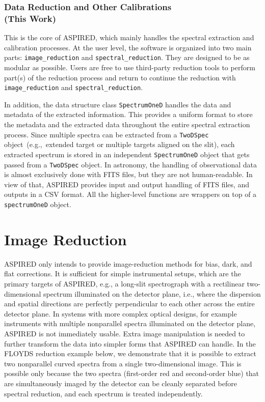 \documentclass[linenumbers, twocolumn]{aastex631}
\begin{document}
\subsubsection*{Data Reduction and Other Calibrations\\(This Work)}
This is the core of \textsc{ASPIRED}, which mainly handles the spectral
extraction and calibration processes. At the user level, the software is
organized into two main parts: \texttt{image\_reduction} and
\texttt{spectral\_reduction}. They are designed to be as modular as possible.
Users are free to use third-party reduction tools to perform part(s) of 
the reduction process and return to continue the reduction with
\texttt{image\_reduction} and \texttt{spectral\_reduction}.

In addition, the data structure class \texttt{SpectrumOneD} handles the
data and metadata of the extracted information. This provides a uniform format
to store the metadata and the extracted data throughout the entire spectral
extraction process. Since multiple spectra can be extracted from a
\texttt{TwoDSpec} object~(e.g.,\ extended target or multiple targets aligned on
the slit), each extracted spectrum is stored in an independent
\texttt{SpectrumOneD} object that gets passed from a \texttt{TwoDSpec} object.
In astronomy, the handling of observational
data is almost exclusively done with FITS files, but they are not
human-readable. In view of that, \textsc{ASPIRED} provides input
and output handling of FITS files, and outputs in a CSV format. All the
higher-level functions are wrappers on top of a \texttt{spectrumOneD} object.

\section{Image Reduction}
\label{sec:image_reduction}

\textsc{ASPIRED} only intends to provide image-reduction methods
for bias, dark, and flat corrections. It is sufficient for simple instrumental
setups, which are the primary targets of \textsc{ASPIRED},
e.g., a long-slit spectrograph with a rectilinear
two-dimensional spectrum illuminated on the detector plane, i.e., where the dispersion
and spatial directions are perfectly perpendicular to each other across the
entire detector plane.
In systems with more complex optical designs, for example
instruments with multiple nonparallel spectra illuminated on the
detector plane, \textsc{ASPIRED} is not immediately usable. Extra image
manipulation is needed to further transform the data into simpler forms that
\textsc{ASPIRED} can handle. In the FLOYDS reduction example below, we
demonstrate that it is possible to extract two nonparallel curved spectra
from a single two-dimensional image. This is possible only because the two
spectra  (first-order red and second-order blue) that are simultaneously
imaged by the detector can be cleanly separated before spectral reduction,
and each spectrum is treated independently.
\end{document}
